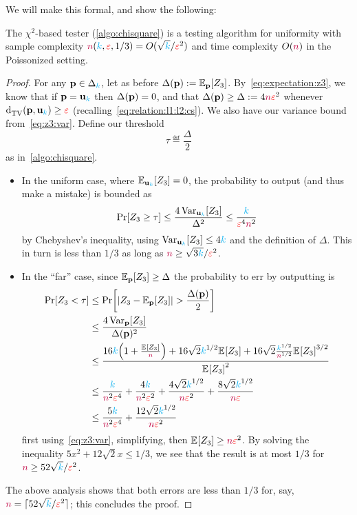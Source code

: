 We will make this formal, and show the following:
\begin{theorem}
The $\chi^2$-based tester (\cref{algo:chisquare}) is a testing algorithm for uniformity with sample complexity ${\textcolor{purple}{n}}({\textcolor{cyan}{k}},\textcolor{red}{\varepsilon},1/3) = O(\sqrt{{\textcolor{cyan}{k}}}/\textcolor{red}{\varepsilon}^2)$ and time complexity $O({\textcolor{purple}{n}})$ in the Poissonized setting.
\end{theorem}
\begin{proof}
For any $\mathbf{p}\in\Delta_{{\textcolor{cyan}{k}}}$, let as before $\Delta(\p) \eqdef \bE{\p}{Z_3}$. By~\cref{eq:expectation:z3}, we know that if $\mathbf{p}=\mathbf{u}_{\textcolor{cyan}{k}}$ then $\Delta(\mathbf{p})=0$, and that $\Delta(\mathbf{p}) \geq \Delta := 4{\textcolor{purple}{n}}\textcolor{red}{\varepsilon}^2$ whenever $\totalvardist{\p}{\uniform_\ab} \geq \dst$ (recalling~\cref{eq:relation:l1:l2:cs}). We also have our variance bound from~\cref{eq:z3:var}. Define our threshold
\[
    \tau \eqdef \frac{\Delta}{2}
\]
as in~\cref{algo:chisquare}.
\begin{itemize}
    \item In the uniform case, where $\bE{\uniform_\ab}{Z_3}=0$, the probability to output \reject (and thus make a mistake) is bounded as
    \[
    \bPr{Z_3 \geq \tau} \leq \frac{4\Var_{\uniform_\ab}[Z_3]}{\Delta^2}
    \leq \frac{\ab}{\dst^4\ns^2}
    \]
    by Chebyshev's inequality, using $\operatorname{Var}_{\mathbf{u}_{\textcolor{cyan}{k}}}[Z_3] \leq 4{\textcolor{cyan}{k}}$ and the definition of $\Delta$. This in turn is less than $1/3$ as long as ${\textcolor{purple}{n}} \geq \sqrt{3{\textcolor{cyan}{k}}}/\textcolor{red}{\varepsilon}^2$.
    \item In the ``far'' case, since $\bE{\p}{Z_3} \geq \Delta$ the probability to err by outputting \accept is
    \begin{align*}
        \bPr{Z_3 < \tau} %
        &\leq \bPr{\abs{Z_3 - \bE{\p}{Z_3}} > \frac{\Delta(\p)}{2} } \\
        &\leq \frac{4\Var_{\p}[Z_3]}{\Delta(\p)^2} \\
        &\leq \frac{16\ab\Paren{ 1 + \frac{\bEE{Z_3}}{\ns}  } + 16\sqrt{2}\ab^{1/2}\bEE{Z_3}+16\sqrt{2}\frac{\ab^{1/2}}{\ns^{1/2}} \bEE{Z_3}^{3/2}}{\bEE{Z_3}^2} \\
        &\leq \frac{\ab}{\ns^2\dst^4} + \frac{4\ab}{\ns^2\dst^2} + \frac{4\sqrt{2}\ab^{1/2}}{\ns\dst^2}+\frac{8\sqrt{2}\ab^{1/2}}{\ns\dst} \\
        &\leq \frac{5\ab}{\ns^2\dst^4} + \frac{12\sqrt{2}\ab^{1/2}}{\ns\dst^2}
    \end{align*}
    first using~\cref{eq:z3:var}, simplifying, then $\bEE{Z_3}\geq \ns\dst^2$. By solving the inequality $5x^2 + 12\sqrt{2}x \leq 1/3$, we see that the result is at most $1/3$ for ${\textcolor{purple}{n}} \geq 52\sqrt{{\textcolor{cyan}{k}}}/\textcolor{red}{\varepsilon}^2$.
  \end{itemize}
  The above analysis shows that both errors are less than $1/3$ for, say, ${\textcolor{purple}{n}} = \lceil{52\sqrt{{\textcolor{cyan}{k}}}/\textcolor{red}{\ensuremath{\varepsilon}}^2}\rceil$; this concludes the proof.
\end{proof}

